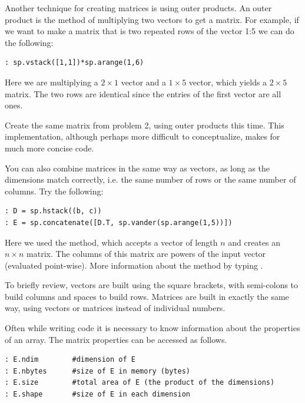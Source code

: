 Another technique for creating matrices is using outer products. An outer
product is the method of multiplying two vectors to get a matrix. For example,
if we want to make a matrix that is two repeated rows of the vector 1:5 we can
do the following:

\begin{lstlisting}
: sp.vstack([1,1])*sp.arange(1,6)
\end{lstlisting}

Here we are multiplying a $2 \times 1$ vector and a $1 \times 5$ vector, which
yields a $2 \times 5$ matrix. The two rows are identical since the entries of
the first vector are all ones.

\begin{problem}
Create the same matrix from problem 2, using outer products this time. This
implementation, although perhaps more difficult to conceptualize, makes for much
more concise code.
\end{problem}

You can also combine matrices in the same way as vectors, as long as the
dimensions match correctly, i.e. the same number of rows or the same number of
columns. Try the following:

\begin{lstlisting}
: D = sp.hstack((b, c))
: E = sp.concatenate([D.T, sp.vander(sp.arange(1,5))])
\end{lstlisting}

Here we used the  method, which accepts a vector of length $n$ and
creates an $n \times n$ matrix. The columns of this matrix are powers of the
input vector (evaluated point-wise). More information about the 
method by typing .

To briefly review, vectors are built using the square brackets, with semi-colons
to build columns and spaces to build rows. Matrices are built in exactly the
same way, using vectors or matrices instead of individual numbers.

Often while writing code it is necessary to know information about the
properties of an array.  The matrix properties can be accessed as follows.

\begin{lstlisting}
: E.ndim        #dimension of E
: E.nbytes      #size of E in memory (bytes)
: E.size        #total area of E (the product of the dimensions)
: E.shape       #size of E in each dimension
\end{lstlisting}

